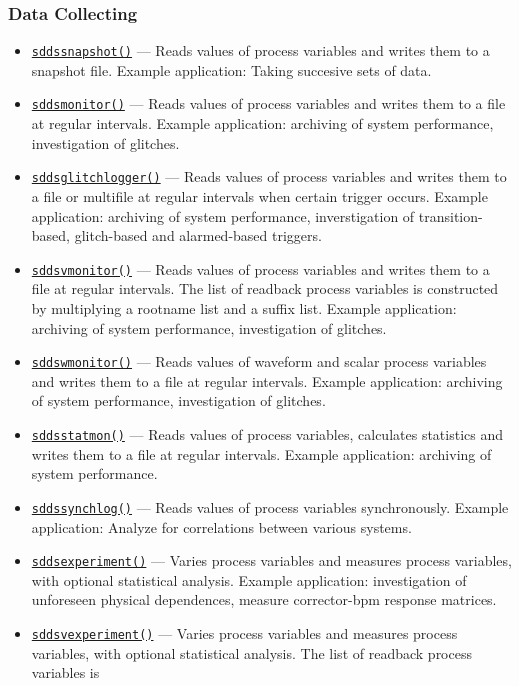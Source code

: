 \documentclass[11pt]{article}
\newcommand{\progref}[1]{\hyperref[#1]{\texttt{#1()}}}
\begin{document}
\subsubsection{Data Collecting}
\begin{itemize}
\item \progref{sddssnapshot} --- Reads values of process variables and writes them to a snapshot file. 
        Example application: Taking succesive sets of data.
\item \progref{sddsmonitor} --- Reads values of process variables and writes them to a file at regular intervals.
        Example application: archiving of system performance, investigation of glitches.
\item \progref{sddsglitchlogger} --- Reads values of process variables and writes them to a file or multifile at regular intervals when certain trigger occurs. 
        Example application: archiving of system performance, inverstigation of 
        transition-based, glitch-based and alarmed-based triggers. 
\item \progref{sddsvmonitor} --- Reads values of process variables
        and writes them to a file at regular intervals. The list of readback process
        variables is constructed by multiplying a rootname list and a suffix list.
        Example application: archiving of system performance, investigation of
        glitches.
\item \progref{sddswmonitor} --- Reads values of waveform and scalar process variables and writes them to a file at regular intervals.
        Example application: archiving of system performance, investigation of glitches.
\item \progref{sddsstatmon} --- Reads values of process variables, calculates statistics and writes them to a file at regular intervals.
        Example application: archiving of system performance.
\item \progref{sddssynchlog} --- Reads values of process variables
        synchronously.  Example application: Analyze for correlations
        between various systems.
\item \progref{sddsexperiment} --- Varies process variables and measures process variables, 
        with optional statistical analysis.
        Example application:  investigation of unforeseen physical dependences,
        measure corrector-bpm response matrices.
\item \progref{sddsvexperiment} --- Varies process variables and measures process variables, 
        with optional statistical analysis. The list of readback process variables is

\end{itemize}
\end{document}
